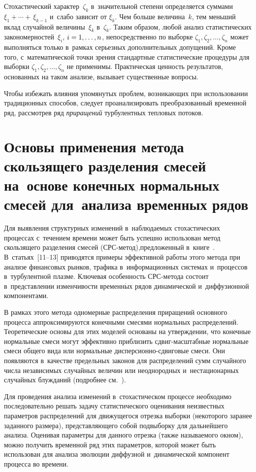\begin{multicols}{2}
Стохастический характер~$\zeta_k$  в~значительной степени
определяется суммами $\xi_1+\cdots+\,\xi_{k-1}$ и~слабо зависит от
$\xi_k$. Чем больше величина~$k$, тем меньший вклад случайной
величины~$\xi_k$ в~$\zeta_k$. Таким образом, любой анализ
статистических закономерностей~$\xi_i$, $i\hm=1,\ldots,n$,
непосредственно по выборке $\zeta_1,\zeta_2,\ldots,\zeta_n$ может
выполняться только в~рамках серь\-ез\-ных дополнительных допущений.
Кроме того, с~математической точки зрения стандартные
статистические процедуры для выборки
$\zeta_1,\zeta_2,\ldots,\zeta_n$ не применимы. Практическая ценность
результатов, основанных на таком анализе, вызывает существенные
вопросы.

Чтобы избежать влияния упомянутых проблем, возникающих при
использовании традиционных способов, следует проанализировать
преобразованный временной ряд, рассмотрев ряд \textit{приращений} 
турбулентных тепловых потоков.

\section{Оcновы применения метода скользящего разделения смесей
на~основе конечных нормальных смесей 
для~анализа временных рядов}

Для выявления структурных изменений в~наблюдаемых стохастических
процессах с~течением времени может быть успешно использован метод
скользящего разделения смесей (СРС-ме\-тод),\linebreak предложенный 
в~книге~\cite{Korolev2011}. В~статьях~[11--13] приводятся примеры
эффективной работы этого метода при анализе финансовых рынков,
трафика в~информацион\-ных системах и~процессов в~турбулентной плазме.
Ключевая особенность СРС-ме\-то\-да состоит в~представлении изменчивости
временн$\acute{\mbox{ы}}$х рядов динамической и~диффузионной компонентами.

В рамках этого метода одномерные распределения приращений основного
процесса аппрок\-симируются конечными смесями нормальных
распреде\-лений. Теоретические основы для этих моделей основаны на
утверждении, что конечные нормальные смеси могут эффективно
приблизить сдвиг-мас\-штаб\-ные нормальные смеси общего вида или
нормальные дис\-пер\-си\-он\-но-сдви\-го\-вые смеси. Они появляются в~качестве
предельных законов для распределений сумм случайного числа
независи\-мых случайных величин или неоднородных и~нестационарных
случайных блужданий (подробнее
см.~\cite{Korolev2011,Korolev2014,ZaksKorolev2013}).

Для проведения анализа изменений в~стохастическом процессе
необходимо последовательно решать задачу статистического
оценивания неизвестных параметров распределений для
движущегося отрезка выборки (некоторого заранее заданного
размера), представляющего собой подвыборку для дальнейшего
анализа. Оценивая параметры для данного отрезка (также
называемого  окном), можно получить временной ряд
этих параметров, которой может быть использован для анализа
эволюции диффузной и~динамической компонент процесса во
времени.


\end{multicols}
